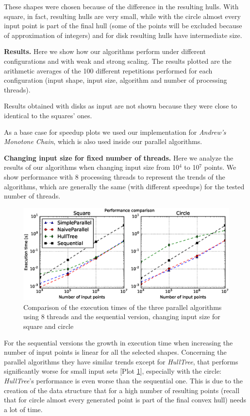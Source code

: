 \documentclass[letterpaper]{article}
\newcommand{\mypar}[1]{{\bf #1.}}
\theoremstyle{definition}
\begin{document}
These shapes were chosen because of the difference in the resulting hulls.
With square, in fact, resulting hulls are very small, while with the circle almost every input point is part of the final hull (some of the points will be excluded because of approximation of integers) and for disk resulting hulls have intermediate size.

\mypar{Results}
Here we show how our algorithms perform under different configurations and with weak and strong scaling.
The results plotted are the arithmetic averages of the 100 different repetitions performed for each configuration (input shape, input size, algorithm and number of processing threads).

Results obtained with disks as input are not shown because they were close to identical to the squares' ones.

As a base case for speedup plots we used our implementation for \textit{Andrew's Monotone Chain}, which is also used inside our parallel algorithms.

\mypar{Changing input size for fixed number of threads}
Here we analyze the results of our algorithms when changing input size from 10$^4$ to 10$^7$ points. 
We show performance with 8 processing threads to represent the trends of the algorithms, which are generally the same (with different speedups) for the tested number of threads.

\begin{figure}[!ht]\centering
  \includegraphics[scale=0.33]{./plots/time_points.eps}
  \caption{Comparison of the execution times of the three parallel algorithms using 8 threads and the sequential version, changing input size for square and circle\label{Input size time}}
\end{figure}

For the sequential versions the growth in execution time when increasing the number of input points is linear for all the selected shapes.
Concerning the parallel algorithms they have similar trends except for \textit{HullTree}, that performs significantly worse for small input sets [Plot \ref{Input size time}], especially with the circle: \textit{HullTree}'s performance is even worse than the sequential one.
This is due to the creation of the data structure that for a high number of resulting points (recall that for circle almost every generated point is part of the final convex hull) needs a lot of time.
\end{document}
